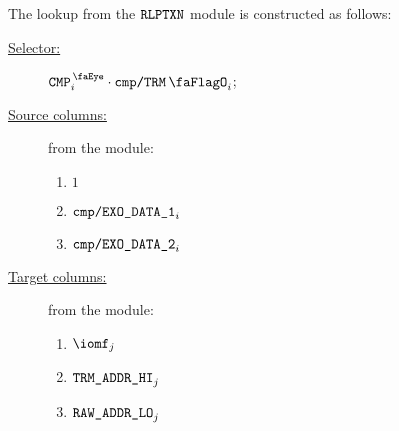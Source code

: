 The lookup from the $\texttt{RLPTXN}$ module is constructed as follows:
\begin{description}
	\item[\underline{Selector:}] $\isCmp_{i} \cdot \rlpTxnComputationColumnTrmFlag_{i}$;
	\item[\underline{Source columns:}] from the \rlpTxnMod{} module:
	\begin{multicols}{3}
	\begin{enumerate}
		\item $1$
		\item $\texttt{cmp}\texttt{/}\texttt{{\texttt{EXO\_DATA\_1}}}_{i}$
		\item $\texttt{cmp}\texttt{/}\texttt{{\texttt{EXO\_DATA\_2}}}_{i}$
	\end{enumerate}
	\end{multicols}
\item[\underline{Target columns:}] from the \trmMod{} module: 
	\begin{multicols}{3}
	\begin{enumerate}
		\item $\iomf_{j}$
		\item $\texttt{TRM}\texttt{\_}\texttt{ADDR}\texttt{\_HI}_{j}$
		\item $\texttt{RAW\_ADDR\_LO}_{j}$
	\end{enumerate} 
	\end{multicols}
\end{description}
